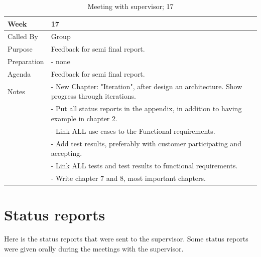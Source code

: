 {\footnotesize
\begin{table}[H]
\begin{tabular}{| p{5cm} | p{10cm} |}\hline
	\textbf{Week}	& \textbf{17} \\ \hline
	Called	By		& Group\\ \hline
	Purpose		& Feedback for semi final report.\\ \hline
	Preparation 
		& - none\\ 
		
	Agenda
		& Feedback for semi final report. \\

	Notes	& - New Chapter: "Iteration", after design an architecture. Show progress through iterations.\\
& - Put all status reports in the appendix, in addition to having example in chapter 2.\\
& - Link ALL use cases to the Functional requirements.\\
& - Add test results, preferably with customer participating and accepting.\\
& - Link ALL tests and test results to functional requirements.\\
& - Write chapter 7 and 8, most important chapters.\\ \hline
	
\end{tabular}


\caption{Meeting with supervisor; 17}
\label{fig:s_meeting_17}
\end{table}}

\section*{Status reports}

Here is the status reports that were sent to the supervisor. Some status reports were given orally during the meetings with the supervisor. 

